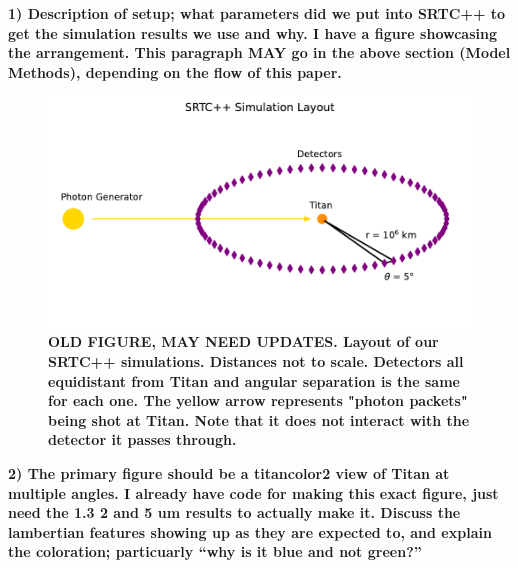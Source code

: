 \documentclass[twocolumn,linenumbers]{aastex631}
\begin{document}
\textbf{\color{blue}1) Description of setup; what parameters did we put into SRTC++ to get the simulation results we use and why. I have a figure showcasing the arrangement. This paragraph MAY go in the above section (Model Methods), depending on the flow of this paper. \color{black}}

\begin{figure}[htbp]
\includegraphics[scale = 0.5]{SRTCLayout.pdf}
\centering
\caption{\textbf{\color{blue}OLD FIGURE, MAY NEED UPDATES. Layout of our SRTC++ simulations. Distances not to scale. Detectors all equidistant from Titan and angular separation is the same for each one. The yellow arrow represents "photon packets" being shot at Titan. Note that it does not interact with the detector it passes through.\color{black}}}
\label{fig:5}
\end{figure}

\textbf{\color{blue}2) The primary figure should be a titancolor2 view of Titan at multiple angles. I already have code for making this exact figure, just need the 1.3 2 and 5 um results to actually make it. Discuss the lambertian features showing up as they are expected to, and explain the coloration; particuarly ``why is it blue and not green?''\color{black}}
\end{document}

